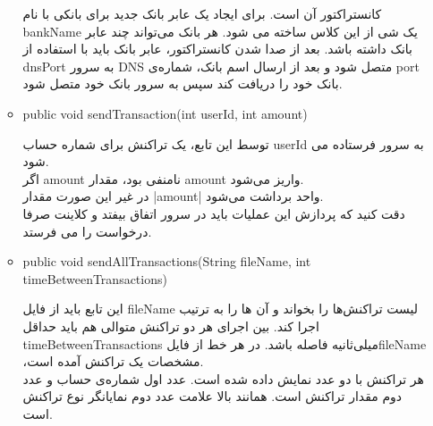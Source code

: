 \documentclass[]{article}
\begin{document}
\begin{itemize}
\begin{itemize}[label = {}]
کانستراکتور آن است. برای ایجاد یک عابر بانک جدید برای بانکی با نام bankName یک شی از این کلاس ساخته می شود. هر بانک می‌تواند چند عابر بانک داشته باشد. بعد از صدا شدن کانستراکتور، عابر بانک باید با استفاده از dnsPort به سرور DNS متصل شود و بعد از ارسال اسم بانک، شماره‌ی ‌port بانک خود را دریافت کند سپس به سرور بانک خود متصل شود.



\item
\begin{tcolorbox}[boxrule=0pt]
	\begin{latin}
  	  \large{
  	  	public void sendTransaction(int userId, int amount)
		}
	\end{latin}
\end{tcolorbox}

توسط این تابع، یک تراکنش برای شماره‌ حساب userId به سرور فرستاده می شود.\\
اگر amount نامنفی بود، مقدار ‌amount واریز می‌شود.\\
در غیر این‌ صورت مقدار |amount| واحد برداشت می‌شود.\\
دقت کنید که پردازش این عملیات باید در سرور اتفاق بیفتد و کلاینت صرفا درخواست را می فرستد.


\item
\begin{tcolorbox}[boxrule=0pt]
	\begin{latin}
  	  \large{
  	  	public void sendAllTransactions(String fileName, int timeBetweenTransactions)
		}
	\end{latin}
\end{tcolorbox}

این تابع باید از فایل fileName لیست تراکنش‌ها را بخواند و آن ها را به ترتیب اجرا کند. بین اجرای هر دو تراکنش متوالی هم باید حداقل timeBetweenTransactions میلی‌ثانیه فاصله باشد. در هر خط از فایلfileName ،مشخصات یک تراکنش آمده است.\\
هر تراکنش با دو عدد نمایش داده شده است. عدد اول شماره‌ی حساب و عدد دوم مقدار تراکنش است. همانند بالا علامت عدد دوم نمایانگر نوع تراکنش است.
\end{itemize}
\end{itemize}

\newpage
\end{document}
